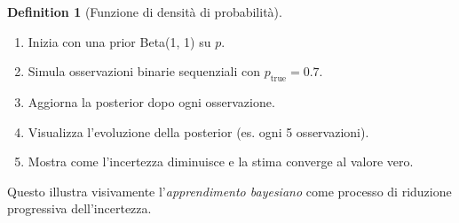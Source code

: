 \documentclass[
  letterpaper,
  DIV=11,
  numbers=noendperiod,
  oneside]{scrreprt}
\providecommand{\tightlist}{%
  \setlength{\itemsep}{0pt}\setlength{\parskip}{0pt}}
\theoremstyle{definition}
\theoremstyle{plain}
\theoremstyle{definition}
\newtheorem{definition}{Definition}[chapter]
\theoremstyle{remark}
\begin{document}
\begin{definition}[Funzione di densità di
probabilità]
\begin{tcolorbox}
\begin{enumerate}
\def\labelenumi{\arabic{enumi}.}
\tightlist
\item
  Inizia con una prior Beta(1, 1) su \(p\).
\item
  Simula osservazioni binarie sequenziali con \(p_{\text{true}} = 0.7\).
\item
  Aggiorna la posterior dopo ogni osservazione.
\item
  Visualizza l'evoluzione della posterior (es. ogni 5 osservazioni).
\item
  Mostra come l'incertezza diminuisce e la stima converge al valore
  vero.
\end{enumerate}

Questo illustra visivamente l'\emph{apprendimento bayesiano} come
processo di riduzione progressiva dell'incertezza.

\end{tcolorbox}

\begin{tcolorbox}[enhanced jigsaw, arc=.35mm, breakable, colbacktitle=quarto-callout-caution-color!10!white, opacityback=0, toprule=.15mm, rightrule=.15mm, colback=white, opacitybacktitle=0.6, leftrule=.75mm, coltitle=black, bottomtitle=1mm, left=2mm, toptitle=1mm, title=\textcolor{quarto-callout-caution-color}{\faFire}\hspace{0.5em}{Informazioni sull'ambiente di sviluppo}, titlerule=0mm, bottomrule=.15mm, colframe=quarto-callout-caution-color-frame]


\end{tcolorbox}
\end{definition}
\end{document}
